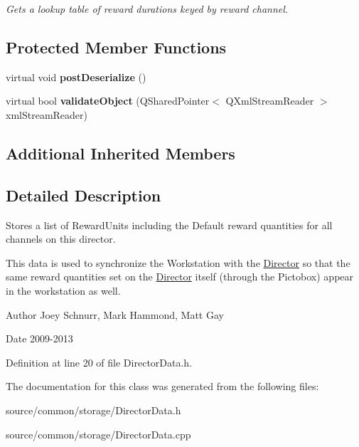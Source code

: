 \begin{DoxyCompactItemize}
\begin{DoxyCompactList}\small\item\em Gets a lookup table of reward durations keyed by reward channel. \end{DoxyCompactList}\end{DoxyCompactItemize}
\subsection*{Protected Member Functions}
\begin{DoxyCompactItemize}
\item 
\hypertarget{class_picto_1_1_director_data_a5080db62a22b2fbf0c0d18708e73df40}{virtual void {\bfseries post\-Deserialize} ()}\label{class_picto_1_1_director_data_a5080db62a22b2fbf0c0d18708e73df40}

\item 
\hypertarget{class_picto_1_1_director_data_a88fed13281348e6ff18cd6bc3a70c8c3}{virtual bool {\bfseries validate\-Object} (Q\-Shared\-Pointer$<$ Q\-Xml\-Stream\-Reader $>$ xml\-Stream\-Reader)}\label{class_picto_1_1_director_data_a88fed13281348e6ff18cd6bc3a70c8c3}

\end{DoxyCompactItemize}
\subsection*{Additional Inherited Members}


\subsection{Detailed Description}
Stores a list of Reward\-Units including the Default reward quantities for all channels on this director. 

This data is used to synchronize the Workstation with the \hyperlink{class_director}{Director} so that the same reward quantities set on the \hyperlink{class_director}{Director} itself (through the Pictobox) appear in the workstation as well. \begin{DoxyAuthor}{Author}
Joey Schnurr, Mark Hammond, Matt Gay 
\end{DoxyAuthor}
\begin{DoxyDate}{Date}
2009-\/2013 
\end{DoxyDate}


Definition at line 20 of file Director\-Data.\-h.



The documentation for this class was generated from the following files\-:\begin{DoxyCompactItemize}
\item 
source/common/storage/Director\-Data.\-h\item 
source/common/storage/Director\-Data.\-cpp\end{DoxyCompactItemize}
